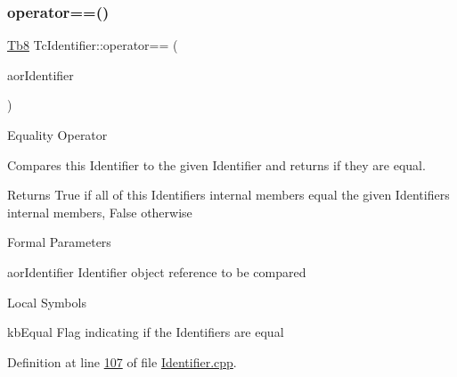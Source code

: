 \mbox{\label{class_g_n_common_1_1_n_notification_1_1_tc_identifier_a1250350af717cc758d44354232acbc04}} 
\subsubsection{\texorpdfstring{operator==()}{operator==()}}
{\footnotesize\ttfamily \mbox{\hyperlink{namespace_g_n_common_a8115dc7ed53b6e5b52e6bfde1632ea74}{Tb8}} Tc\+Identifier\+::operator== (\begin{DoxyParamCaption}\item[{const \mbox{\hyperlink{class_g_n_common_1_1_n_notification_1_1_tc_identifier}{Tc\+Identifier}} \&}]{aor\+Identifier }\end{DoxyParamCaption})}

Equality Operator

Compares this Identifier to the given Identifier and returns if they are equal.

\begin{DoxyReturn}{Returns}
True if all of this Identifier\textquotesingle{}s internal members equal the given Identifier\textquotesingle{}s internal members, False otherwise
\end{DoxyReturn}
\begin{DoxyParagraph}{Formal Parameters}

\begin{DoxyPre}{\ttfamily [ in ]  aorIdentifier    Identifier object reference to be compared }\end{DoxyPre}

\end{DoxyParagraph}
\begin{DoxyParagraph}{Local Symbols}

\begin{DoxyPre}{\ttfamily  kbEqual    Flag indicating if the Identifiers are equal }\end{DoxyPre}
 
\end{DoxyParagraph}


Definition at line \mbox{\hyperlink{_identifier_8cpp_source_l00107}{107}} of file \mbox{\hyperlink{_identifier_8cpp_source}{Identifier.\+cpp}}.



